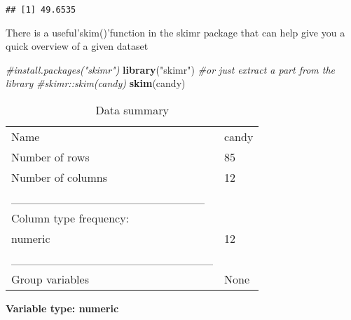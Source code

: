 \documentclass[
]{article}
\newenvironment{Shaded}{\begin{snugshade}}{\end{snugshade}}
\newcommand{\CommentTok}[1]{\textcolor[rgb]{0.56,0.35,0.01}{\textit{#1}}}
\newcommand{\FunctionTok}[1]{\textcolor[rgb]{0.13,0.29,0.53}{\textbf{#1}}}
\newcommand{\NormalTok}[1]{#1}
\newcommand{\SpecialCharTok}[1]{\textcolor[rgb]{0.81,0.36,0.00}{\textbf{#1}}}
\newcommand{\StringTok}[1]{\textcolor[rgb]{0.31,0.60,0.02}{#1}}
\begin{document}
\begin{Shaded}
\end{Shaded}

\begin{verbatim}
## [1] 49.6535
\end{verbatim}

There is a useful'skim()'function in the skimr package that can help
give you a quick overview of a given dataset

\begin{Shaded}
\begin{Highlighting}[]
\CommentTok{\#install.packages("skimr")}
\FunctionTok{library}\NormalTok{(}\StringTok{"skimr"}\NormalTok{)}
\CommentTok{\#or just extract a part from the library }
\CommentTok{\#skimr::skim(candy)}
\FunctionTok{skim}\NormalTok{(candy)}
\end{Highlighting}
\end{Shaded}

\begin{longtable}[]{@{}ll@{}}
\caption{Data summary}\tabularnewline
\toprule\noalign{}
\endfirsthead
\endhead
\bottomrule\noalign{}
\endlastfoot
Name & candy \\
Number of rows & 85 \\
Number of columns & 12 \\
\_\_\_\_\_\_\_\_\_\_\_\_\_\_\_\_\_\_\_\_\_\_\_ & \\
Column type frequency: & \\
numeric & 12 \\
\_\_\_\_\_\_\_\_\_\_\_\_\_\_\_\_\_\_\_\_\_\_\_\_ & \\
Group variables & None \\
\end{longtable}

\textbf{Variable type: numeric}
\end{document}
